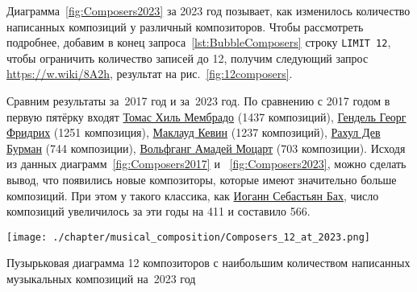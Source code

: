 Диаграмма~\ref{fig:Composers2023} за 2023 год позывает, 
как изменилось количество написанных композиций у различный композиторов. 
Чтобы рассмотреть подробнее, 
добавим в конец запроса~\ref{lst:BubbleComposers} строку  \lstinline|LIMIT 12|, 
чтобы ограничить количество записей до 12, 
получим следующий запрос \href{https://w.wiki/8A2h}{https://w.wiki/8A2h}, 
результат на рис.~\ref{fig:12composers}. 

Сравним результаты за~2017 год и за~2023 год.
По сравнению с 2017 годом в первую пятёрку входят 
\href{https://ca.wikipedia.org/wiki/Tomàs_Gil_i_Membrado}{Томас Хиль Мембрадо} 
(\num{1437} композиций), 
\href{https://ru.wikipedia.org/wiki/Гендель,_Георг_Фридрих}{Гендель Георг Фридрих} (\num{1251} композиция), 
\href{https://ru.wikipedia.org/wiki/Маклауд,_Кевин}{Маклауд Кевин} (\num{1237} композиций), 
\href{https://en.wikipedia.org/wiki/R._D._Burman}{Рахул Дев Бурман} (\num{744} композиции), 
\href{https://ru.wikipedia.org/wiki/Моцарт,_Вольфганг_Амадей}{Вольфганг Амадей Моцарт} (\num{703} композиции). 
Исходя из данных диаграмм~\ref{fig:Composers2017} и ~\ref{fig:Composers2023}, 
можно сделать вывод, что появились новые композиторы, 
которые имеют значительно больше композиций. 
При этом у такого классика, как 
\href{https://ru.wikipedia.org/?curid=17950}{Иоганн Себастьян Бах}, 
число композиций увеличилось за эти годы на 411 и составило 566. 


\newpage
\begin{marginfigure}
  \texttt{[image: ./chapter/musical\_composition/Composers\_12\_at\_2023.png]}
  \caption[Диаграмма 12 композиторов с наибольшим количеством написанных музыкальных композиций на~2023 год]
          {Пузырьковая диаграмма 12 композиторов с наибольшим количеством написанных музыкальных композиций на~2023 год}%
  \label{fig:12composers}%
\end{marginfigure}


